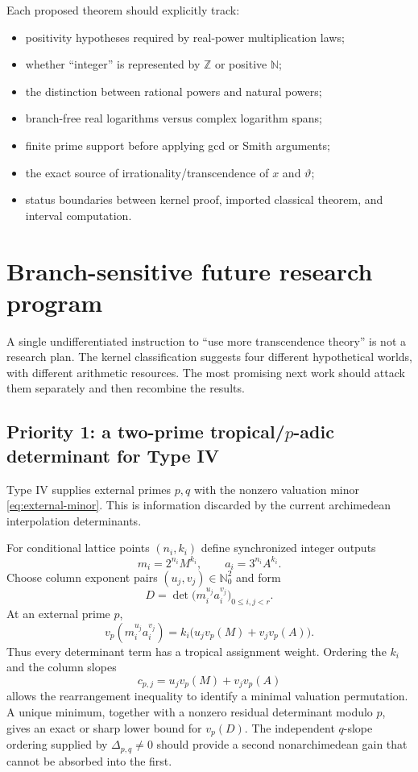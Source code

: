\documentclass[11pt,oneside]{article}
\theoremstyle{definition}
\theoremstyle{remark}
\newcommand{\N}{\mathbb N}
\newcommand{\Nzero}{\mathbb N_0}
\newcommand{\Z}{\mathbb Z}
\newcommand{\vpp}[2]{v_{#1}\!\left(#2\right)}
\begin{document}
Each proposed theorem should explicitly track:

\begin{itemize}
\item positivity hypotheses required by real-power multiplication laws;
\item whether ``integer'' is represented by $\Z$ or positive $\N$;
\item the distinction between rational powers and natural powers;
\item branch-free real logarithms versus complex logarithm spans;
\item finite prime support before applying gcd or Smith arguments;
\item the exact source of irrationality/transcendence of $x$ and $\vartheta$;
\item status boundaries between kernel proof, imported classical theorem, and interval
      computation.
\end{itemize}

\section{Branch-sensitive future research program}\label{sec:future}

A single undifferentiated instruction to ``use more transcendence theory'' is not a research
plan.  The kernel classification suggests four different hypothetical worlds, with different
arithmetic resources.  The most promising next work should attack them separately and then
recombine the results.

\subsection{Priority 1: a two-prime tropical/\texorpdfstring{$p$-adic}{p-adic} determinant for Type IV}

Type IV supplies external primes $p,q$ with the nonzero valuation minor
\eqref{eq:external-minor}.  This is information discarded by the current archimedean
interpolation determinants.

For conditional lattice points $(n_i,k_i)$ define synchronized integer outputs
\[
  m_i=2^{n_i}M^{k_i},
  \qquad
  a_i=3^{n_i}A^{k_i}.
\]
Choose column exponent pairs $(u_j,v_j)\in\Nzero^2$ and form
\[
  D=\det\bigl(m_i^{u_j}a_i^{v_j}\bigr)_{0\le i,j<r}.
                                                        \tag{13.1}\label{eq:adelic-det}
\]
At an external prime $p$,
\[
  \vpp p{m_i^{u_j}a_i^{v_j}}
   =k_i\bigl(u_j\vpp pM+v_j\vpp pA\bigr).
                                                        \tag{13.2}\label{eq:tropical-weight}
\]
Thus every determinant term has a tropical assignment weight.  Ordering the $k_i$ and the
column slopes
\[
 c_{p,j}=u_j\vpp pM+v_j\vpp pA
\]
allows the rearrangement inequality to identify a minimal valuation permutation.  A unique
minimum, together with a nonzero residual determinant modulo $p$, gives an exact or sharp
lower bound for $v_p(D)$.  The independent $q$-slope ordering supplied by
$\Delta_{p,q}\ne0$ should provide a second nonarchimedean gain that cannot be absorbed into
the first.
\end{document}
